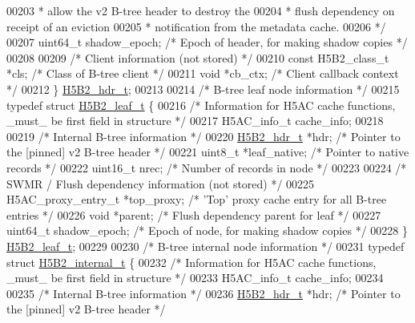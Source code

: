 \begin{DoxyCode}
{{00203 \textcolor{comment}{                                 * allow the v2 B-tree header to destroy the}
00204 \textcolor{comment}{                                 * flush dependency on receipt of an eviction}
00205 \textcolor{comment}{                                 * notification from the metadata cache.}
00206 \textcolor{comment}{                 */}
00207     uint64\_t    shadow\_epoch;   \textcolor{comment}{/* Epoch of header, for making shadow copies */}
00208 
00209     \textcolor{comment}{/* Client information (not stored) */}
00210     \textcolor{keyword}{const} H5B2\_class\_t *cls;    \textcolor{comment}{/* Class of B-tree client */}
00211     \textcolor{keywordtype}{void}        *cb\_ctx;        \textcolor{comment}{/* Client callback context */}
00212 \} \hyperlink{struct_h5_b2__hdr__t}{H5B2\_hdr\_t};
00213 
00214 \textcolor{comment}{/* B-tree leaf node information */}
00215 \textcolor{keyword}{typedef} \textcolor{keyword}{struct }\hyperlink{struct_h5_b2__leaf__t}{H5B2\_leaf\_t} \{
00216     \textcolor{comment}{/* Information for H5AC cache functions, \_must\_ be first field in structure */}
00217     H5AC\_info\_t cache\_info;
00218 
00219     \textcolor{comment}{/* Internal B-tree information */}
00220     \hyperlink{struct_h5_b2__hdr__t}{H5B2\_hdr\_t}    *hdr;       \textcolor{comment}{/* Pointer to the [pinned] v2 B-tree header   */}
00221     uint8\_t     *leaf\_native;   \textcolor{comment}{/* Pointer to native records                  */}
00222     uint16\_t    nrec;           \textcolor{comment}{/* Number of records in node                  */}
00223 
00224     \textcolor{comment}{/* SWMR / Flush dependency information (not stored) */}
00225     H5AC\_proxy\_entry\_t *top\_proxy;  \textcolor{comment}{/* 'Top' proxy cache entry for all B-tree entries */}
00226     \textcolor{keywordtype}{void}        *parent;        \textcolor{comment}{/* Flush dependency parent for leaf           */}
00227     uint64\_t    shadow\_epoch;   \textcolor{comment}{/* Epoch of node, for making shadow copies */}
00228 \} \hyperlink{struct_h5_b2__leaf__t}{H5B2\_leaf\_t};
00229 
00230 \textcolor{comment}{/* B-tree internal node information */}
00231 \textcolor{keyword}{typedef} \textcolor{keyword}{struct }\hyperlink{struct_h5_b2__internal__t}{H5B2\_internal\_t} \{
00232     \textcolor{comment}{/* Information for H5AC cache functions, \_must\_ be first field in structure */}
00233     H5AC\_info\_t cache\_info;
00234 
00235     \textcolor{comment}{/* Internal B-tree information */}
00236     \hyperlink{struct_h5_b2__hdr__t}{H5B2\_hdr\_t}    *hdr;       \textcolor{comment}{/* Pointer to the [pinned] v2 B-tree header   */}
}}
\end{DoxyCode}
